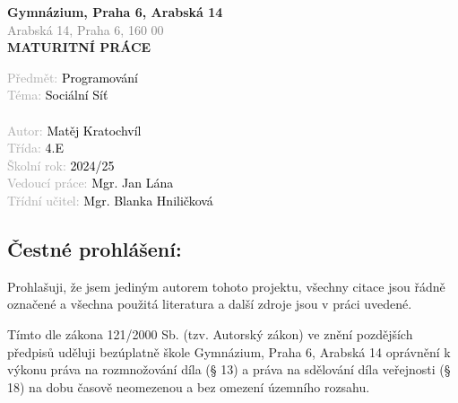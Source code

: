 \documentclass[12pt]{article}
\begin{document}
\thispagestyle{empty}
\begin{titlepage}
    \begin{center}
        \vspace*{1cm}

        {\Large \textbf{Gymnázium, Praha 6, Arabská 14}} \\
        \vspace{0.5cm} 
        \textcolor{gray}{\large Arabská 14, Praha 6, 160 00}\\
        \vspace{5cm} 
        {\Large \textbf{MATURITNÍ PRÁCE}}\\
        \vspace{5cm}
    \end{center}
    \vspace{4cm}
    \textcolor{darkgray}{\large
    Předmět:\hspace{0.2cm} \textcolor{black}{Programování}\\
    Téma:\hspace{0.2cm} \textcolor{black}{Sociální Síť}\\
    \vspace{0.8cm} \\
    Autor:\hspace{0.2cm} \textcolor{black}{Matěj Kratochvíl} \\
    Třída:\hspace{0.2cm} \textcolor{black}{4.E} \\
    Školní rok:\hspace{0.2cm} \textcolor{black}{2024/25} \\
    Vedoucí práce:\hspace{0.2cm} \textcolor{black}{Mgr. Jan Lána} \\
    Třídní učitel:\hspace{0.2cm} \textcolor{black}{Mgr. Blanka Hniličková} \\
    }
\end{titlepage}

\newpage
\thispagestyle{empty}
\mbox{}
\vfill
\begin{Large}
\section*{\textbf{Čestné prohlášení:}}
\end{Large}

\par Prohlašuji, že jsem jediným autorem tohoto projektu, všechny citace jsou řádně označené a všechna použitá literatura a další zdroje jsou v práci uvedené. \par Tímto dle zákona 121/2000 Sb. (tzv. Autorský zákon) ve znění pozdějších předpisů uděluji bezúplatně škole Gymnázium, Praha 6, Arabská 14 oprávnění k výkonu práva na rozmnožování díla (§ 13) a práva na sdělování díla veřejnosti (§ 18) na dobu časově neomezenou a bez omezení územního rozsahu.
\newline
\end{document}
